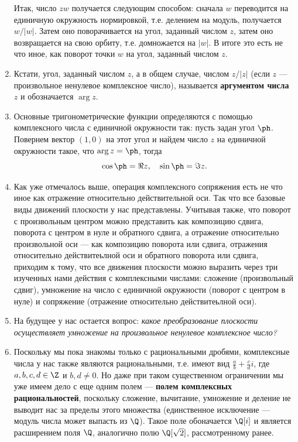 \begin{enumerate}
Итак, число $zw$ получается следующим способом: сначала $w$ переводится на единичную окружность нормировкой, т.е. делением на модуль, получается $w/|w|$. Затем оно поворачивается на угол, заданный числом $z$, затем оно возвращается на свою орбиту, т.е. домножается на $|w|$. В итоге это есть не что иное, как поворот точки $w$ на угол, заданный числом $z$.
\item Кстати, угол, заданный числом $z$, а в общем случае, числом $z/|z|$ (если $z$ --- произвольное ненулевое комплексное число), называется \textbf{аргументом числа} $z$ и обозначается $\arg z$.
\item Основные тригонометрические функции определяются с помощью комплексного числа с единичной окружности так: пусть задан угол $\ph$. Повернем вектор $(1,0)$ на этот угол и найдем число $z$ на единичной окружности такое, что $\arg z=\ph$, тогда
$$
\cos\ph = \Re z,\quad \sin\ph=\Im z.
$$
\item Как уже отмечалось выше, операция комплексного сопряжения есть не что иное как отражение относительно действительной оси. Так что все базовые виды движений плоскости у нас представлены. Учитывая также, что поворот с произвольным центром можно представить как композицию сдвига, поворота с центром в нуле и обратного сдвига, а отражение относительно произвольной оси --- как композицию поворота или сдвига, отражения относительно действитеьлной оси и обратного поворота или сдвига, приходим к тому, что все движения плоскости можно выразить через три изученных нами действия с комплексными числами: сложение (произвольный сдвиг), умножение на число с единичной окружности (поворот с центром в нуле) и сопряжение (отражение относительно действитеьлной оси).
\item На будущее у нас остается вопрос: \textit{какое преобразование плоскости осуществляет умножение на произвольное ненулевое комплексное число?}
\item Поскольку мы пока знакомы только с рациональными дробями, комплексные числа у нас также являются рациональными, т.е. имеют вид $\frac{a}{b}+\frac{c}{d}i$, где $a,b,c,d\in\Z$ и $b,d\ne 0$. Но даже при таком существенном ограничении мы уже имеем дело с еще одним полем --- \textbf{полем комплексных рациональностей}, поскольку сложение, вычитание, умножение и деление не выводит нас за пределы этого множества (единственное исключение --- модуль числа может выпасть из $\Q$). Такое поле обоначается $\Q[i]$ и является расширением поля $\Q$, аналогично полю $\Q[\sqrt 2]$, рассмотренному ранее.
\end{enumerate}

